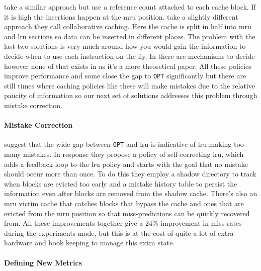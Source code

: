 \citet{sreedharanCacheReplacementPolicy2017} take a similar approach but use a reference count attached to each cache block. If it is high the insertions happen at the \gls{mru} position. \citet{guTheoryPotentialLRUMRU2011} take a slightly different approach they call collaborative caching. Here the cache is split in half into \gls{mru} and \gls{lru} sections so data can be inserted in different places. The problem with the last two solutions is very much around how you would gain the information to decide when to use each instruction on the fly. In \citet{sreedharanCacheReplacementPolicy2017, qureshiAdaptiveInsertionPolicies2007} there are mechanisms to decide however none of that exists in \citet{guTheoryPotentialLRUMRU2011} as it's a more theoretical paper. All these policies improve performance and some close the gap to \texttt{OPT} significantly but there are still times where caching policies like these will make mistakes due to the relative paucity of information so our next set of solutions addresses this problem through mistake correction.

\paragraph{Mistake Correction}

\citet{kampeSelfCorrectingLRUReplacement2004} suggest that the wide gap between \texttt{OPT} and \gls{lru} is indicative of \gls{lru} making too many mistakes. In response they propose a policy of self-correcting \gls{lru}, which adds a feedback loop to the \gls{lru} policy and starts with the goal that no mistake should occur more than once. To do this they employ a shadow directory to track when blocks are evicted too early and a mistake history table to persist the information even after blocks are removed from the shadow cache. There's also an \gls{mru} victim cache that catches blocks that bypass the cache and ones that are evicted from the \gls{mru} position so that miss-predictions can be quickly recovered from. All these improvements together give a 24\% improvement in miss rates during the experiments made, but this is at the cost of quite a lot of extra hardware and book keeping to manage this extra state.

\paragraph{Defining New Metrics}

